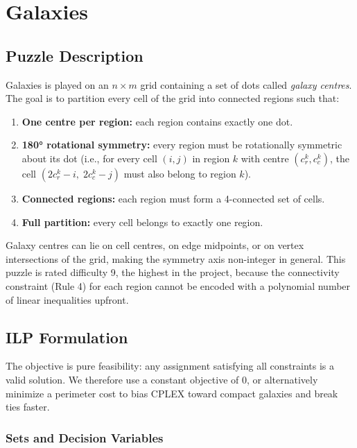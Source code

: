 \section{Galaxies}
\label{sec:galaxies}

\subsection{Puzzle Description}

Galaxies is played on an $n \times m$ grid containing a set of dots called \emph{galaxy centres}. The goal is to partition every cell of the grid into connected regions such that:
\begin{enumerate}
  \item \textbf{One centre per region:} each region contains exactly one dot.
  \item \textbf{180° rotational symmetry:} every region must be rotationally symmetric about its dot (i.e., for every cell $(i,j)$ in region $k$ with centre $(c_r^k, c_c^k)$, the cell $(2c_r^k - i,\; 2c_c^k - j)$ must also belong to region $k$).
  \item \textbf{Connected regions:} each region must form a 4-connected set of cells.
  \item \textbf{Full partition:} every cell belongs to exactly one region.
\end{enumerate}

Galaxy centres can lie on cell centres, on edge midpoints, or on vertex intersections of the grid, making the symmetry axis non-integer in general. This puzzle is rated difficulty 9, the highest in the project, because the connectivity constraint (Rule 4) for each region cannot be encoded with a polynomial number of linear inequalities upfront.

\subsection{ILP Formulation}
 
The objective is pure feasibility: any assignment satisfying all constraints is a valid solution. We therefore use a constant objective of $0$, or alternatively minimize a perimeter cost to bias CPLEX toward compact galaxies and break ties faster.

\subsubsection{Sets and Decision Variables}

